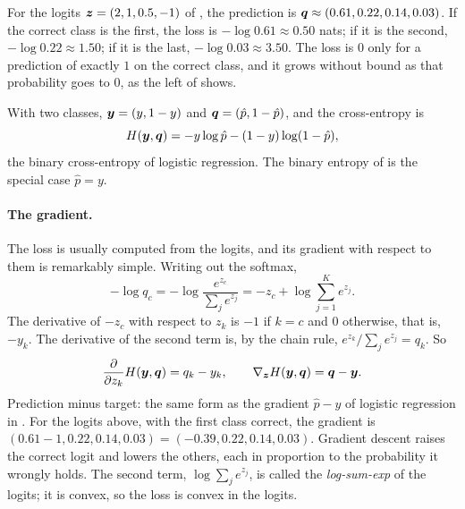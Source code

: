 For the logits $\bm{z} = (2, 1, 0.5, -1)$ of ,
the prediction is $\bm{q} \approx (0.61, 0.22, 0.14, 0.03)$. If the
correct class is the first, the loss is $-\log 0.61 \approx 0.50$ nats;
if it is the second, $-\log 0.22 \approx 1.50$; if it is the last,
$-\log 0.03 \approx 3.50$. The loss is $0$ only for a prediction of
exactly $1$ on the correct class, and it grows without bound as that
probability goes to $0$, as the left of  shows.

With two classes, $\bm{y} = (y, 1 - y)$ and $\bm{q} = (\hat{p}, 1 -
\hat{p})$, and the cross-entropy is
\[
  H(\bm{y}, \bm{q}) = -y \log \hat{p} - (1 - y) \log (1 - \hat{p}),
\]
the binary cross-entropy of logistic regression. The binary entropy of
 is the special case $\hat{p} = y$.

\paragraph{The gradient.}
The loss is usually computed from the logits, and its gradient with
respect to them is remarkably simple. Writing out the softmax,
\[
  -\log q_c = -\log \frac{e^{z_c}}{\sum_j e^{z_j}}
  = -z_c + \log \sum_{j=1}^{K} e^{z_j} .
\]
The derivative of $-z_c$ with respect to $z_k$ is $-1$ if $k = c$ and $0$
otherwise, that is, $-y_k$. The derivative of the second term is, by the
chain rule, $e^{z_k} / \sum_j e^{z_j} = q_k$. So
\begin{equation}
  \frac{\partial}{\partial z_k} H(\bm{y}, \bm{q}) = q_k - y_k,
  \qquad
  \nabla_{\bm{z}} H(\bm{y}, \bm{q}) = \bm{q} - \bm{y} .
  \label{eq:ch07-ce-grad}
\end{equation}
Prediction minus target: the same form as the gradient $\hat{p} - y$ of
logistic regression in . For the logits above, with
the first class correct, the gradient is $(0.61 - 1, 0.22, 0.14, 0.03) =
(-0.39, 0.22, 0.14, 0.03)$. Gradient descent raises the correct logit and
lowers the others, each in proportion to the probability it wrongly
holds. The second term, $\log \sum_j e^{z_j}$, is called the
\emph{log-sum-exp} of the logits; it is convex, so the loss is convex in
the logits.

